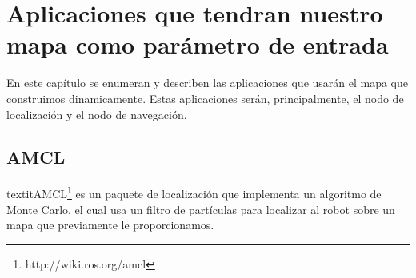 \chapter{Aplicaciones que tendran nuestro mapa como parámetro de entrada}
\label{cap:aplicaciones}

En este capítulo se enumeran y describen las aplicaciones que usarán el mapa que construimos dinamicamente. Estas aplicaciones serán, principalmente, el nodo de localización y el nodo de navegación.

\section{AMCL}
\label{sec:amcl}
textit{AMCL}\footnote{http://wiki.ros.org/amcl} es un paquete de localización que implementa un algoritmo de Monte Carlo, el cual usa un filtro de partículas para localizar al robot sobre un mapa que previamente le proporcionamos.